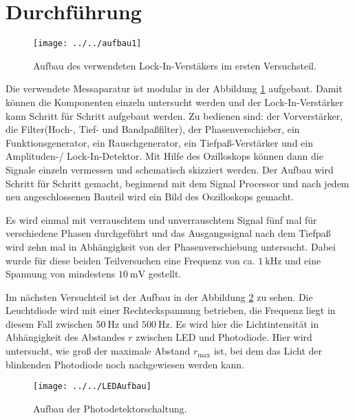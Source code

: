 \section{Durchführung}
\label{sec:Durchführung}
\begin{figure}[h!]
	\centering
	\texttt{[image: ../../aufbau1]}
	\caption{Aufbau des verwendeten Lock-In-Verstäkers im ersten Versuchsteil. }
	\label{fig:aufbau1}
\end{figure}

Die verwendete Messaparatur ist modular in der Abbildung \ref{fig:aufbau1} aufgebaut. Damit können die Komponenten einzeln untersucht werden und der Lock-In-Verstärker kann Schritt für Schritt aufgebaut werden. 
Zu bedienen sind: der Vorverstärker, die Filter(Hoch-, Tief- und Bandpaßfilter), der Phasenverschieber, ein Funktionsgenerator, ein Rauschgenerator, ein Tiefpaß-Verstärker und ein Amplituden-/ Lock-In-Detektor. Mit Hilfe des Ozilloskops können dann die Signale einzeln vermessen und schematisch skizziert werden. Der Aufbau wird Schritt für Schritt gemacht, beginnend mit dem Signal Processor und nach jedem neu angeschlossenen Bauteil wird ein Bild des Oszilloskops gemacht. 

Es wird einmal mit verrauschtem und unverrauschtem Signal fünf mal für verschiedene Phasen durchgeführt und das Ausgangssignal nach dem Tiefpaß wird zehn mal in Abhängigkeit von der Phasenverschiebung untersucht. Dabei wurde für diese beiden Teilversuchen eine Frequenz von ca. $\SI{1}{\kilo\hertz}$ und eine Spannung von mindestens $\SI{10}{\milli\volt}$ gestellt.

Im nächsten Versuchteil ist der Aufbau in der Abbildung \ref{fig:ledaufbau} zu sehen. Die Leuchtdiode wird mit einer Rechteckspannung betrieben, die Frequenz liegt in diesem Fall zwischen $\SI{50}{\hertz}$ und $\SI{500}{\hertz}$.
Es wird hier die Lichtintensität in Abhängigkeit des Abstandes $r$ zwischen LED und Photodiode. Hier wird untersucht, wie groß der maximale Abstand $r_\text{max}$ ist, bei dem das Licht der blinkenden Photodiode noch nachgewiesen werden kann. 
\begin{figure}[h!]
	\centering
	\texttt{[image: ../../LEDAufbau]}
	\caption{Aufbau der Photodetektorschaltung. }
	\label{fig:ledaufbau}
\end{figure}
